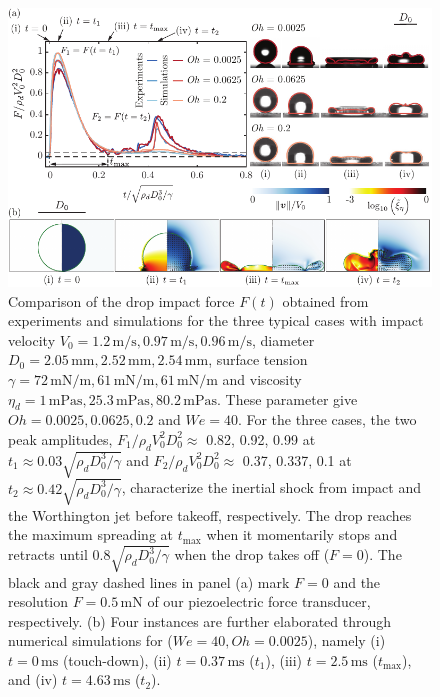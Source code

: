 \documentclass[]{article}
\newcommand{\oo}{\color{magenta} \normalfont}
\begin{document}
\begin{enumerate}
	\begin{figure}
		\centering
		\includegraphics[width=\textwidth]{../Main/Figures/Figure1_summary_v6.pdf}
		\caption{{\oo Comparison of the drop impact force $F(t)$ obtained from experiments and simulations for the three typical cases with impact velocity $V_0 = 1.2\,\si{\meter}/\si{\second}, 0.97\,\si{\meter}/\si{\second}, 0.96\,\si{\meter}/\si{\second}$, diameter $D_0 = 2.05\,\si{\milli\meter}, 2.52\,\si{\milli\meter}, 2.54\,\si{\milli\meter}$, surface tension $\gamma = 72\,\si{\milli\newton}/\si{\meter}, 61\,\si{\milli\newton}/\si{\meter}, 61\,\si{\milli\newton}/\si{\meter}$ and viscosity $\eta_d = 1\,\si{\milli\pascal\second}, 25.3\,\si{\milli\pascal\second}, 80.2\,\si{\milli\pascal\second}$. These parameter give $Oh = 0.0025, 0.0625, 0.2$ and $We = 40$.
				For the three cases, the two peak amplitudes, $F_1/\rho_dV_0^2D_0^2 \approx$ 0.82, 0.92, 0.99 at $t_1 \approx 0.03\sqrt{\rho_dD_0^3/\gamma}$ and $F_2/\rho_dV_0^2D_0^2 \approx$ 0.37, 0.337, 0.1 at $t_2 \approx 0.42\sqrt{\rho_dD_0^3/\gamma}$, characterize the inertial shock from impact and the Worthington jet before takeoff, respectively. 
				The drop reaches the maximum spreading at $t_{\text{max}}$ when it momentarily stops and retracts until $0.8\sqrt{\rho_dD_0^3/\gamma}$ when the drop takes off ($F = 0$). The black and gray dashed lines in panel (a) mark $F = 0$ and the resolution $F = 0.5\,\si{\milli\newton}$ of our piezoelectric force transducer, respectively.
				(b) Four instances are further elaborated through numerical simulations for ($We = 40, Oh = 0.0025$), namely (i) $t = 0\,\si{\milli\second}$ (touch-down), (ii) $t = 0.37\,\si{\milli\second}$ ($t_1$), (iii) $t = 2.5\,\si{\milli\second}$ ($t_{\text{max}}$), and (iv) $t = 4.63\,\si{\milli\second}$ ($t_2$).
}}
\end{figure}
\end{enumerate}
\end{document}
